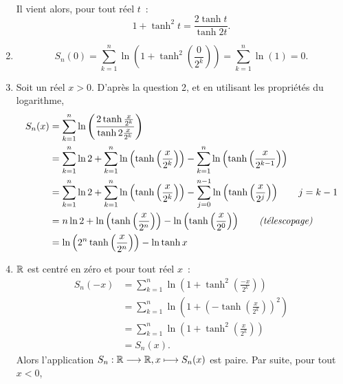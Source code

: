 \begin{corrige}
\begin{enumerate}
\begin{align*}
            \end{align*}
            Il vient alors, pour tout réel \(t\)~:
            \begin{equation*}
                1+\tanh^2 t = \frac{2\tanh t}{\tanh 2t}.
            \end{equation*}
        \item
            \begin{equation*}
                S_n(0) = \sum_{k=1}^{n} \ln\left(1+\tanh^2\left(\frac{0}{2^k}\right)\right) = \sum_{k=1}^{n}\ln(1) = 0.
            \end{equation*}
        \item Soit un réel \(x>0\). D'après la question 2, et en utilisant les propriétés du logarithme,
            \begin{align*}
                S_n(x)  &= \sum_{k=1}^{n} \ln\left(\frac{2\tanh \frac{x}{2^k}}{\tanh 2\frac{x}{2^k}}\right) \\
                        &= \sum_{k=1}^{n} \ln 2 + \sum_{k=1}^{n} \ln\left(\tanh\left(\frac{x}{2^k}\right)\right) - \sum_{k=1}^{n} \ln\left(\tanh\left(\frac{x}{2^{k-1}}\right)\right) \\
                        &=  \sum_{k=1}^{n} \ln 2 + \sum_{k=1}^{n} \ln\left(\tanh\left(\frac{x}{2^k}\right)\right) - \sum_{j=0}^{n-1} \ln\left(\tanh\left(\frac{x}{2^{j}}\right)\right) \qquad j=k-1 \\
                        &= n\ln 2 + \ln\left(\tanh\left(\frac{x}{2^n}\right)\right) - \ln\left(\tanh\left(\frac{x}{2^0}\right)\right) \qquad \text{\emph{(télescopage)}}\\
                        &= \ln\left(2^n\tanh\left(\frac{x}{2^n}\right)\right) - \ln\tanh x
            \end{align*}
        \item \(\mathbb{R}\) est centré en zéro et pour tout réel \(x\)~:
            \begin{align*}
                S_n(-x) &= \sum_{k=1}^{n}\ln\left(1+\tanh^2\left(\frac{-x}{2^k}\right)\right) \\
                        &= \sum_{k=1}^{n}\ln\left(1+\left(-\tanh\left(\frac{x}{2^k}\right)\right)^2\right) \\
                        &= \sum_{k=1}^{n}\ln\left(1+\tanh^2\left(\frac{x}{2^k}\right)\right) \\
                        &= S_n(x).
            \end{align*}
            Alors l'application \(S_n:\mathbb{R} \longrightarrow \mathbb{R}, x \longmapsto S_n(x)\) est paire. Par suite, pour tout \(x < 0\),

\end{enumerate}
\end{corrige}
